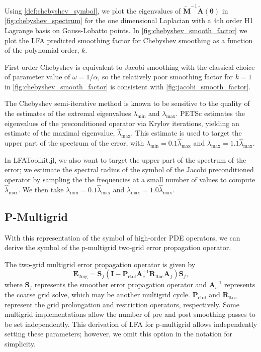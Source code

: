 \documentclass[review]{siamart190516}
\begin{document}
Using \cref{def:chebyshev_symbol}, we plot the eigenvalues of $\tilde{\mathbf{M}}^{-1} \tilde{\mathbf{A}} \left( \boldsymbol{\theta} \right)$ in \cref{fig:chebyshev_spectrum} for the one dimensional Laplacian with a 4th order H1 Lagrange basis on Gauss-Lobatto points.
In \cref{fig:chebyshev_smooth_factor} we plot the LFA predicted smoothing factor for Chebyshev smoothing as a function of the polynomial order, $k$.

First order Chebyshev is equivalent to Jacobi smoothing with the classical choice of parameter value of $\omega = 1 / \alpha$, so the relatively poor smoothing factor for $k = 1$ in \cref{fig:chebyshev_smooth_factor} is consistent with \cref{fig:jacobi_smooth_factor}.

The Chebyshev semi-iterative method is known to be sensitive to the quality of the estimates of the extremal eigenvalues $\lambda_{\text{min}}$ and $\lambda_{\text{max}}$.
PETSc \cite{petsc-user-ref} estimates the eigenvalues of the preconditioned operator via Krylov iterations, yielding an estimate of the maximal eigenvalue, $\hat{\lambda}_{\text{max}}$.
This estimate is used to target the upper part of the spectrum of the error, with $\lambda_{\text{min}} = 0.1 \hat{\lambda}_{\text{max}}$ and $\lambda_{\text{max}} = 1.1 \hat{\lambda}_{\text{max}}$.

In LFAToolkit.jl, we also want to target the upper part of the spectrum of the error; we estimate the spectral radius of the symbol of the Jacobi preconditioned operator by sampling the the frequencies at a small number of values to compute $\hat{\lambda}_{\text{max}}$.
We then take $\lambda_{\text{min}} = 0.1 \hat{\lambda}_{\text{max}}$ and $\lambda_{\text{max}} = 1.0 \hat{\lambda}_{\text{max}}$.

\subsection{P-Multigrid}\label{sec:multigrid}

With this representation of the symbol of high-order PDE operators, we can derive the symbol of the p-multigrid two-grid error propagation operator.

The two-grid multigrid error propagation operator is given by
\begin{equation}
\mathbf{E}_{\text{2mg}} = \mathbf{S}_f \left( \mathbf{I} - \mathbf{P}_{\text{ctof}} \mathbf{A}_c^{-1} \mathbf{R}_{\text{ftoc}} \mathbf{A}_f \right) \mathbf{S}_f,
\end{equation}
where $\mathbf{S}_f$ represents the smoother error propagation operator and $\mathbf{A}_c^{-1}$ represents the coarse grid solve, which may be another multigrid cycle.
$\mathbf{P}_{\text{ctof}}$ and $\mathbf{R}_{\text{ftoc}}$ represent the grid prolongation and restriction operators, respectively.
Some multigrid implementations allow the number of pre and post smoothing passes to be set independently.
This derivation of LFA for p-multigrid allows independently setting these parameters; however, we omit this option in the notation for simplicity.
\end{document}
